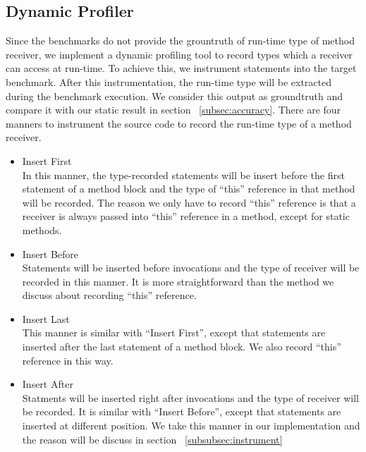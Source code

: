 \documentclass{fac}
\begin{document}
\subsection{Dynamic Profiler}\label{subsec:dynamic-profiler}
Since the benchmarks do not provide the grountruth of run-time type of method receiver, we implement a dynamic profiling tool to record  types which a receiver can access at run-time. To achieve this, we instrument statements into the target benchmark. After this instrumentation, the run-time type will be extracted during the benchmark execution. We consider this output as groundtruth and compare it with our static result in section ~\ref{subsec:accuracy}. There are four manners to instrument the source code to record the run-time type of a method receiver.
\begin{itemize}
\item Insert First\\
In this manner, the type-recorded statements will be insert before the first statement of a method block and the type of ``this'' reference in that method will be recorded. The reason we only have to record ``this'' reference is that a receiver is always passed into ``this'' reference in a method, except for static methods. 
\item Insert Before\\
Statements will be inserted before invocations and the type of receiver will be recorded in this manner. It is more straightforward than the method we discuss about recording ``this'' reference.
\item Insert Last\\
This manner is similar with ``Insert First'', except that statements are inserted after the last statement of a method block. We also record ``this'' reference in this way.
\item Insert After\\
Statments will be inserted right after invocations and the type of receiver will be recorded. It is similar with ``Insert Before'', except that statements are inserted at different position. We take this manner in our implementation and the reason will be discuss in section ~\ref{subsubsec:instrument}
\end{itemize}
\end{document}
